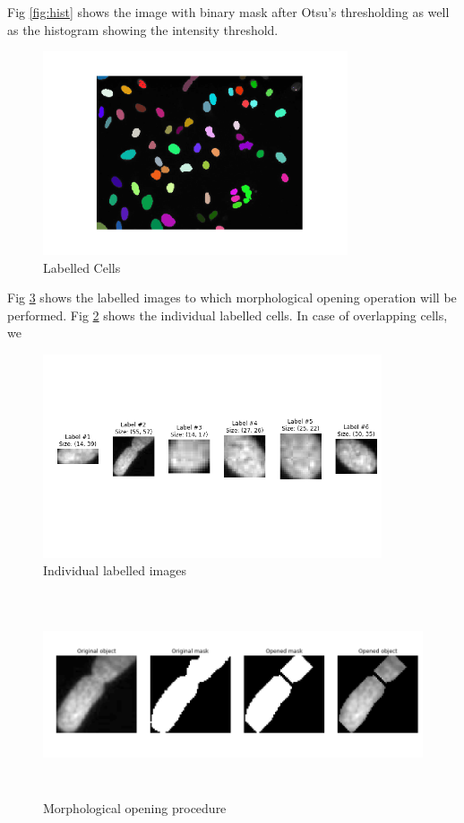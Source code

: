 \documentclass[letterpaper, 10 pt, conference]{ieeeconf}
\begin{document}
Fig \ref{fig:hist} shows the image with binary mask after Otsu's thresholding as well as the histogram showing the intensity threshold.

\begin{figure}
\centering
\includegraphics[height=6cm, width=1.145\linewidth]{labelled_cells.png}
\caption{Labelled Cells}
\label{fig:label}
\end{figure}

Fig \ref{fig:label} shows the labelled images to which morphological opening operation will be performed. Fig \ref{fig:indiLabel} shows the individual labelled cells. In case of overlapping cells, we 

\begin{figure}
\centering
\includegraphics[height=6cm, width=\linewidth]{indiLabel.png}
\caption{Individual labelled images}
\label{fig:indiLabel}
\end{figure}

\begin{figure}
\centering
\includegraphics[height=6cm, width=\linewidth]{mask.png}
\caption{Morphological opening procedure}
\label{fig:label}
\end{figure}
\end{document}
